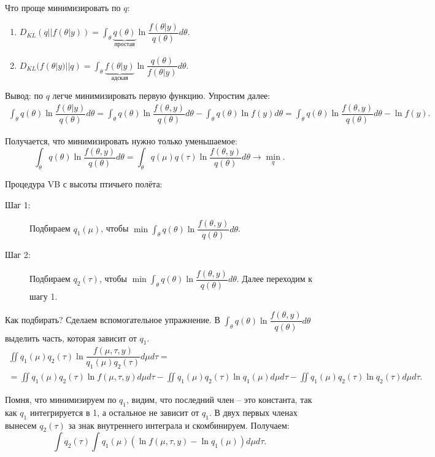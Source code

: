 \documentclass[10pt, a4paper]{extarticle}
\begin{document}
Что проще минимизировать по $q$:
\begin{enumerate}
	\item $D_{KL}(q||f(\theta|y)) = \int_{\theta} \underbrace{q(\theta)}_{\text{простая}} \ln \dfrac{f(\theta|y)}{q(\theta)}d\theta$.
	\item $D_{KL}(f(\theta|y)||q) = \int_{\theta} \underbrace{f(\theta|y)}_{\text{адская}} \ln \dfrac{q(\theta)}{f(\theta|y)}d\theta$.
\end{enumerate}

Вывод: по $q$ легче минимизировать первую функцию. Упростим далее:
\begin{align*}
	\int_{\theta} q(\theta) \ln \dfrac{f(\theta|y)}{q(\theta)}d\theta = \int_{\theta} q(\theta) \ln \dfrac{f(\theta,y)}{q(\theta)}d\theta - \int_{\theta} q(\theta)\ln f(y)d\theta = \int_{\theta} q(\theta) \ln \dfrac{f(\theta,y)}{q(\theta)}d\theta - \ln f(y).
\end{align*}

Получается, что минимизировать нужно только уменьшаемое:
\[
\int_{\theta} q(\theta) \ln \dfrac{f(\theta,y)}{q(\theta)}d\theta = \int_{\theta} q(\mu)q(\tau) \ln \dfrac{f(\theta,y)}{q(\theta)}d\theta \rightarrow \min_{q}.
\]

Процедура VB с высоты птичьего полёта:
\begin{description}
	\item[Шаг 1:] Подбираем $q_1(\mu)$, чтобы $\min \int_{\theta} q(\theta) \ln \dfrac{f(\theta,y)}{q(\theta)}d\theta$.
	
	\item[Шаг 2:] Подбираем $q_2(\tau)$, чтобы $\min \int_{\theta} q(\theta) \ln \dfrac{f(\theta,y)}{q(\theta)}d\theta$. Далее переходим к шагу 1.
\end{description}

Как подбирать? Сделаем вспомогательное упражнение. В $\int_{\theta} q(\theta) \ln \dfrac{f(\theta,y)}{q(\theta)}d\theta$ выделить часть, которая зависит от $q_1$. 
\begin{align*}
	\iint q_1(\mu)q_2(\tau) \ln \dfrac{f(\mu, \tau, y)}{q_1(\mu)q_2(\tau)}d\mu d\tau =\\= \iint q_1(\mu) q_2(\tau) \ln f(\mu, \tau, y)d\mu d\tau - \iint q_1(\mu)q_2(\tau)\ln q_1(\mu) d\mu d\tau - \iint q_1(\mu)q_2(\tau)\ln q_2(\tau) d\mu d\tau.
\end{align*}

Помня, что минимизируем по $q_1$, видим, что последний член -- это константа, так как $q_1$ интегрируется в 1, а остальное не зависит от $q_1$. В двух первых членах вынесем $q_2(\tau)$ за знак внутреннего интеграла и скомбинируем. Получаем:
\[
\int q_2(\tau) \int q_1(\mu)(\ln f(\mu, \tau, y) - \ln q_1(\mu))d\mu d\tau.
\]
\end{document}
